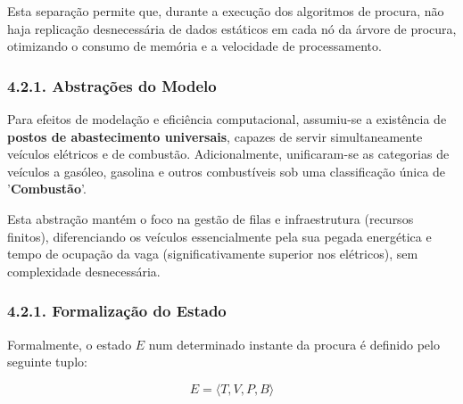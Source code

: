 \documentclass[a4paper]{article}
\begin{document}
\noindent Esta separação permite que, durante a execução dos algoritmos de procura, não haja replicação desnecessária de dados estáticos em cada nó da árvore de procura, otimizando o consumo de memória e a velocidade de processamento.

\subsubsection*{4.2.1. Abstrações do Modelo}
\noindent Para efeitos de modelação e eficiência computacional, assumiu-se a existência de \textbf{postos de abastecimento universais}, capazes de servir simultaneamente veículos elétricos e de combustão. Adicionalmente, unificaram-se as categorias de veículos a gasóleo, gasolina e outros combustíveis sob uma classificação única de '\textbf{Combustão}'.

\noindent Esta abstração mantém o foco na gestão de filas e infraestrutura (recursos finitos), diferenciando os veículos essencialmente pela sua pegada energética e tempo de ocupação da vaga (significativamente superior nos elétricos), sem complexidade desnecessária.

\vspace{0.5cm}

\subsubsection*{4.2.1. Formalização do Estado}
\noindent Formalmente, o estado \( E \) num determinado instante da procura é definido pelo seguinte tuplo:

\[
E = \langle T, V, P, B \rangle
\]
\end{document}
